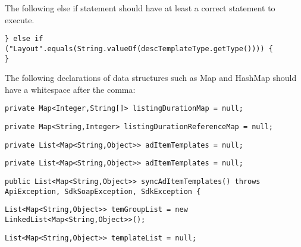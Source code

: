The following else if statement should have at least a correct statement to execute.
\begin{lstlisting}[firstnumber=263, caption={statement does nothing}]
} else if ("Layout".equals(String.valueOf(descTemplateType.getType()))) {
}
\end{lstlisting}
\noindent\makebox[\linewidth]{\rule{\linewidth}{0.4pt}}

The following declarations of data structures such as Map and HashMap should have a whitespace after the comma:
\begin{lstlisting}[firstnumber=67, caption={withespace needed after comma}]
private Map<Integer,String[]> listingDurationMap = null;
\end{lstlisting}
\noindent\makebox[\linewidth]{\rule{\linewidth}{0.4pt}}

\begin{lstlisting}[firstnumber=68, caption={withespace needed after comma}]
private Map<String,Integer> listingDurationReferenceMap = null;
\end{lstlisting}
\noindent\makebox[\linewidth]{\rule{\linewidth}{0.4pt}}

\begin{lstlisting}[firstnumber=73, caption={withespace needed after comma}]
private List<Map<String,Object>> adItemTemplates = null;
\end{lstlisting}
\noindent\makebox[\linewidth]{\rule{\linewidth}{0.4pt}}

\begin{lstlisting}[firstnumber=73, caption={withespace needed after comma}]
private List<Map<String,Object>> adItemTemplates = null;
\end{lstlisting}
\noindent\makebox[\linewidth]{\rule{\linewidth}{0.4pt}}

\begin{lstlisting}[firstnumber=221, caption={withespace needed after comma}]
public List<Map<String,Object>> syncAdItemTemplates() throws ApiException, SdkSoapException, SdkException {
\end{lstlisting}
\noindent\makebox[\linewidth]{\rule{\linewidth}{0.4pt}}

\begin{lstlisting}[firstnumber=224, caption={withespace needed after comma}]
List<Map<String,Object>> temGroupList = new LinkedList<Map<String,Object>>();
\end{lstlisting}
\noindent\makebox[\linewidth]{\rule{\linewidth}{0.4pt}}

\begin{lstlisting}[firstnumber=234, caption={withespace needed after comma}]
List<Map<String,Object>> templateList = null;
\end{lstlisting}
\noindent\makebox[\linewidth]{\rule{\linewidth}{0.4pt}}

